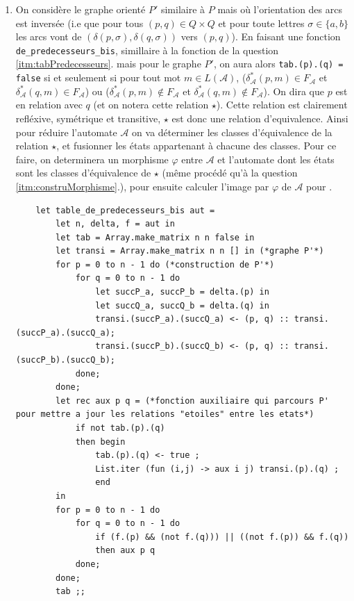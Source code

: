 \documentclass{article}
\begin{document}
\begin{enumerate}
    \item On considère le graphe orienté $P'$ similaire à $P$ mais où l'orientation des arcs est inversée (i.e que pour tous $(p, q) \in Q \times Q$ et pour toute lettres $\sigma \in \{a , b \}$ les arcs vont de $(\delta(p, \sigma), \delta(q, \sigma))$ vers $(p, q)$). En faisant une fonction \verb|de_predecesseurs_bis|, simillaire à la fonction de la question \ref{itm:tabPredecesseurs}. mais pour le graphe $P'$, on aura alors \verb|tab.(p).(q) = false|  si et seulement si pour tout mot $m \in L(\mathcal{A})$, ($\delta_\mathcal{A}^*(p, m) \in F_\mathcal{A}$ et $\delta_\mathcal{A}^*(q, m) \in F_\mathcal{A}$) ou ($\delta_\mathcal{A}^*(p, m) \notin F_\mathcal{A}$ et $\delta_\mathcal{A}^*(q, m) \notin F_\mathcal{A}$). On dira que $p$ est en relation avec $q$ (et on notera cette relation $\star$). \newline
    Cette relation est clairement refléxive, symétrique et transitive, $\star$ est donc une relation d'equivalence. Ainsi pour réduire l'automate $\mathcal{A}$ on va déterminer les classes d'équivalence de la relation $\star$, et fusionner les états appartenant à chacune des classes. Pour ce faire, on determinera un morphisme $\varphi$ entre $\mathcal{A}$ et l'automate dont les états sont les classes d'équivalence de $\star$ (même procédé qu'à la question \ref{itm:construMorphisme}.), pour ensuite calculer l'image par $\varphi$ de $\mathcal{A}$ pour .

    \begin{verbatim}
    let table_de_predecesseurs_bis aut = 
        let n, delta, f = aut in
        let tab = Array.make_matrix n n false in
        let transi = Array.make_matrix n n [] in (*graphe P'*)
        for p = 0 to n - 1 do (*construction de P'*)
            for q = 0 to n - 1 do
                let succP_a, succP_b = delta.(p) in
                let succQ_a, succQ_b = delta.(q) in
                transi.(succP_a).(succQ_a) <- (p, q) :: transi.(succP_a).(succQ_a);
                transi.(succP_b).(succQ_b) <- (p, q) :: transi.(succP_b).(succQ_b);
            done;
        done;
        let rec aux p q = (*fonction auxiliaire qui parcours P' pour mettre a jour les relations "etoiles" entre les etats*)
            if not tab.(p).(q)
            then begin
                tab.(p).(q) <- true ; 
                List.iter (fun (i,j) -> aux i j) transi.(p).(q) ;
                end
        in
        for p = 0 to n - 1 do 
            for q = 0 to n - 1 do
                if (f.(p) && (not f.(q))) || ((not f.(p)) && f.(q))
                then aux p q
            done;
        done;
        tab ;;


\end{verbatim}
\end{enumerate}
\end{document}

